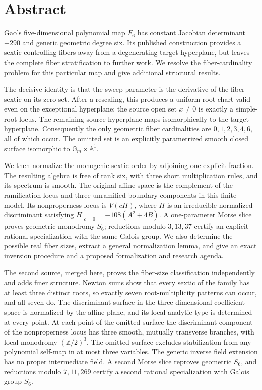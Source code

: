 \documentclass[11pt,a4paper]{article}
\theoremstyle{definition}
\newcommand{\A}{\mathbb A}
\newcommand{\Z}{\mathbb Z}
\newcommand{\Gm}{\mathbb G_m}
\begin{document}
\section*{Abstract}
Gao's five-dimensional polynomial map $F_6$ has constant Jacobian determinant
$-290$ and generic geometric degree six. Its published construction provides
a sextic controlling fibers away from a degenerating target hyperplane,
but leaves the complete fiber stratification to further work. We resolve
the fiber-cardinality problem for this particular map and give additional
structural results.

The decisive identity is that the sweep parameter is the derivative of the
fiber sextic on its zero set. After a rescaling, this produces a uniform
root chart valid even on the exceptional hyperplane: the source open set
$x\ne0$ is exactly a simple-root locus. The remaining source hyperplane
maps isomorphically to the target hyperplane. Consequently the only
geometric fiber cardinalities are $0,1,2,3,4,6$, all of which occur. The
omitted set is an explicitly parametrized smooth closed surface isomorphic
to $\Gm\times\A^1$.

We then normalize the monogenic sextic order by adjoining one explicit
fraction. The resulting algebra is free of rank six, with three short
multiplication rules, and its spectrum is smooth. The original affine
space is the complement of the ramification locus and three unramified
boundary components in this finite model. Its nonproperness locus is
$V(cH)$, where $H$ is an irreducible normalized discriminant satisfying
$H|_{c=0}=-108(A^2+4B)$. A one-parameter Morse slice proves geometric
monodromy $S_6$; reductions modulo $3,13,37$ certify an explicit rational
specialization with the same Galois group. We also determine the possible
real fiber sizes, extract a general normalization lemma, and give an
exact inversion procedure and a proposed formalization and research agenda.

The second source, merged here, proves the fiber-size classification
independently and adds finer structure. Newton sums show that every sextic
of the family has at least three distinct roots, so exactly seven
root-multiplicity patterns can occur, and all seven do. The discriminant
surface in the three-dimensional coefficient space is normalized by the
affine plane, and its local analytic type is determined at every point. At
each point of the omitted surface the discriminant component of the
nonproperness locus has three smooth, mutually transverse branches, with
local monodromy $(\Z/2)^3$. The omitted surface excludes stabilization from
any polynomial self-map in at most three variables. The generic inverse
field extension has no proper intermediate field. A second Morse slice
reproves geometric $S_6$, and reductions modulo $7,11,269$ certify a second
rational specialization with Galois group $S_6$.
\end{document}
